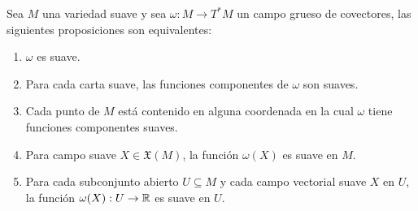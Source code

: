 \begin{theorem}\label{Teorema: Criterio de Suavidad para Campos de Covectores}
	Sea $M$ una variedad suave y sea $\omega: M \to T^{*}M$ un campo grueso de covectores, las siguientes proposiciones son equivalentes:
	\begin{enumerate}
		\item $\omega$ es suave.
		\item Para cada carta suave, las funciones componentes de $\omega$ son suaves.
		\item Cada punto de $M$ está contenido en alguna coordenada en la cual $\omega$ tiene funciones componentes suaves.
		\item Para campo suave $X \in \mathfrak{X}(M)$, la función $\omega(X)$ es suave en $M$.
		\item Para cada subconjunto abierto $U \subseteq M$ y cada campo vectorial suave $X$ en $U$, la función $\omega(X): U \to \mathbb{R}$ es suave en $U$.
	\end{enumerate}
\end{theorem}

